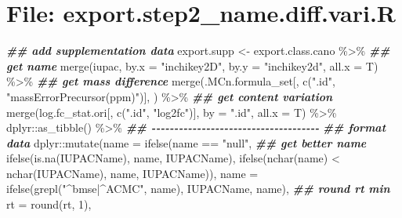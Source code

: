 \documentclass[
]{article}
\newenvironment{Shaded}{\begin{snugshade}}{\end{snugshade}}
\newcommand{\AttributeTok}[1]{\textcolor[rgb]{0.77,0.63,0.00}{#1}}
\newcommand{\DecValTok}[1]{\textcolor[rgb]{0.00,0.00,0.81}{#1}}
\newcommand{\DocumentationTok}[1]{\textcolor[rgb]{0.56,0.35,0.01}{\textbf{\textit{#1}}}}
\newcommand{\FunctionTok}[1]{\textcolor[rgb]{0.00,0.00,0.00}{#1}}
\newcommand{\NormalTok}[1]{#1}
\newcommand{\OtherTok}[1]{\textcolor[rgb]{0.56,0.35,0.01}{#1}}
\newcommand{\SpecialCharTok}[1]{\textcolor[rgb]{0.00,0.00,0.00}{#1}}
\newcommand{\StringTok}[1]{\textcolor[rgb]{0.31,0.60,0.02}{#1}}
\begin{document}
\hypertarget{file-export.step2_name.diff.vari.r}{%
\section{File: export.step2\_name.diff.vari.R}\label{file-export.step2_name.diff.vari.r}}

\begin{Shaded}
\begin{Highlighting}[]
\DocumentationTok{\#\# add supplementation data}
\NormalTok{export.supp }\OtherTok{\textless{}{-}}\NormalTok{ export.class.cano }\SpecialCharTok{\%\textgreater{}\%} 
  \DocumentationTok{\#\# get name}
  \FunctionTok{merge}\NormalTok{(iupac, }\AttributeTok{by.x =} \StringTok{"inchikey2D"}\NormalTok{, }\AttributeTok{by.y =} \StringTok{"inchikey2d"}\NormalTok{, }\AttributeTok{all.x =}\NormalTok{ T) }\SpecialCharTok{\%\textgreater{}\%} 
  \DocumentationTok{\#\# get mass difference}
  \FunctionTok{merge}\NormalTok{(.MCn.formula\_set[, }\FunctionTok{c}\NormalTok{(}\StringTok{".id"}\NormalTok{, }\StringTok{"massErrorPrecursor(ppm)"}\NormalTok{)], ) }\SpecialCharTok{\%\textgreater{}\%} 
  \DocumentationTok{\#\# get content variation}
  \FunctionTok{merge}\NormalTok{(log.fc\_stat.ori[, }\FunctionTok{c}\NormalTok{(}\StringTok{".id"}\NormalTok{, }\StringTok{"log2fc"}\NormalTok{)], }\AttributeTok{by =} \StringTok{".id"}\NormalTok{, }\AttributeTok{all.x =}\NormalTok{ T) }\SpecialCharTok{\%\textgreater{}\%} 
\NormalTok{  dplyr}\SpecialCharTok{::}\FunctionTok{as\_tibble}\NormalTok{() }\SpecialCharTok{\%\textgreater{}\%} 
  \DocumentationTok{\#\# {-}{-}{-}{-}{-}{-}{-}{-}{-}{-}{-}{-}{-}{-}{-}{-}{-}{-}{-}{-}{-}{-}{-}{-}{-}{-}{-}{-}{-}{-}{-}{-}{-}{-}{-}{-}{-} }
  \DocumentationTok{\#\# format data}
\NormalTok{  dplyr}\SpecialCharTok{::}\FunctionTok{mutate}\NormalTok{(}\AttributeTok{name =} \FunctionTok{ifelse}\NormalTok{(name }\SpecialCharTok{==} \StringTok{"null"}\NormalTok{,}
                              \DocumentationTok{\#\# get better name}
                              \FunctionTok{ifelse}\NormalTok{(}\FunctionTok{is.na}\NormalTok{(IUPACName), name, IUPACName),}
                              \FunctionTok{ifelse}\NormalTok{(}\FunctionTok{nchar}\NormalTok{(name) }\SpecialCharTok{\textless{}} \FunctionTok{nchar}\NormalTok{(IUPACName), name, IUPACName)),}
                \AttributeTok{name =} \FunctionTok{ifelse}\NormalTok{(}\FunctionTok{grepl}\NormalTok{(}\StringTok{"\^{}bmse|\^{}ACMC"}\NormalTok{, name), IUPACName, name),}
                \DocumentationTok{\#\# round rt min}
                \AttributeTok{rt =} \FunctionTok{round}\NormalTok{(rt, }\DecValTok{1}\NormalTok{),}

\end{Highlighting}
\end{Shaded}
\end{document}
